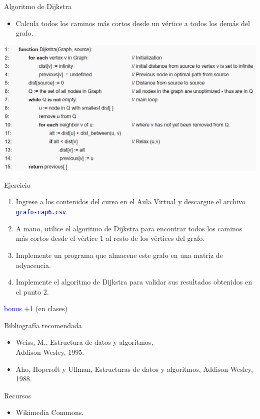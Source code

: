 \documentclass{beamer} %
\newcommand{\blue}[1]{\textcolor{blue}{#1}}
\begin{document}
\begin{frame}{Algoritmo de Dijkstra}
    \begin{itemize}
        \item Calcula todos los caminos más cortos desde un vértice a todos los demás del grafo.
    \end{itemize}
    \begin{center}
    \includegraphics[width=\textwidth]{./image/cap6/dijkstra.png}
    \end{center}
\end{frame}

\begin{frame}{Ejercicio}
  \begin{enumerate}
    \item Ingrese a los contenidos del curso en el Aula Virtual y descargue el archivo \blue{\texttt{grafo-cap6.csv}}.
    \item A mano, utilice el algoritmo de Dijkstra para encontrar todos los caminos más cortos desde el vértice 1 al resto de los vértices del grafo.
    \item Implemente un programa que almacene este grafo en una matriz de adyacencia.
    \item Implemente el algoritmo de Dijkstra para validar sus resultados obtenidos en el punto 2.
  \end{enumerate}
  \begin{flushright}
    \blue{bonus +1} (en clases)
  \end{flushright}
\end{frame}


\begin{frame}
 \begin{block}{Bibliografía recomendada}
  \begin{itemize}
    \item Weiss, M., Estructura de datos y algoritmos,\\ Addison-Wesley, 1995.
    \item Aho, Hopcroft y Ullman, Estructuras de datos y algoritmos, Addison-Wesley, 1988.
  \end{itemize}
 \end{block}
 \begin{block}{Recursos}
  \begin{itemize}
    \item Wikimedia Commons.
  \end{itemize}
 \end{block}
\end{frame}
\end{document}
